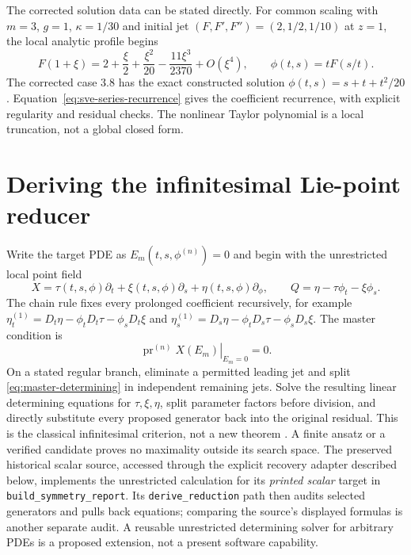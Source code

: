 \documentclass[11pt]{article}
\theoremstyle{definition}
\newcommand{\pr}{\operatorname{pr}}
\begin{document}
The corrected solution data can be stated directly. For common scaling with
$m=3$, $g=1$, $\kappa=1/30$ and initial jet $(F,F',F'')=(2,1/2,1/10)$
at $z=1$, the local analytic profile begins
\[
 F(1+\xi)=2+\frac{\xi}{2}+\frac{\xi^2}{20}
                -\frac{11\xi^3}{2370}+O(\xi^4),\qquad
 \phi(t,s)=tF(s/t).
\]
The corrected case 3.8 has the exact constructed solution
$\phi(t,s)=s+t+t^2/20$. Equation~\eqref{eq:sve-series-recurrence} gives the
coefficient recurrence, with explicit regularity and residual checks. The
nonlinear Taylor polynomial is a local truncation, not a global closed form.

\section{Deriving the infinitesimal Lie-point reducer}
\label{sec:infinitesimal-reducer}
Write the target PDE as $E_m(t,s,\phi^{(n)})=0$ and begin with the unrestricted
local point field
\begin{equation}\label{eq:master-generator}
 X=\tau(t,s,\phi)\partial_t+\xi(t,s,\phi)\partial_s
   +\eta(t,s,\phi)\partial_\phi,
 \qquad Q=\eta-\tau\phi_t-\xi\phi_s.
\end{equation}
The chain rule fixes every prolonged coefficient recursively, for example
$\eta_t^{(1)}=D_t\eta-\phi_tD_t\tau-\phi_sD_t\xi$ and
$\eta_s^{(1)}=D_s\eta-\phi_tD_s\tau-\phi_sD_s\xi$.
The master condition is
\begin{equation}\label{eq:master-determining}
 \left.\pr^{(n)}X(E_m)\right|_{E_m=0}=0.
\end{equation}
On a stated regular branch, eliminate a permitted leading jet and split
\eqref{eq:master-determining} in independent remaining jets. Solve the
resulting linear determining equations for $\tau,\xi,\eta$, split parameter
factors before division, and directly substitute every proposed generator
back into the original residual. This is the classical infinitesimal
criterion, not a new theorem \cite{olver,oliveri2026}. A finite ansatz or a
verified candidate proves no maximality outside its search space.
The preserved historical scalar source, accessed through the explicit
recovery adapter described below, implements the unrestricted calculation
for its \emph{printed scalar} target in \texttt{build\_symmetry\_report}.
Its \texttt{derive\_reduction} path then audits selected generators and
pulls back equations; comparing the source's displayed formulas is another
separate audit. A reusable unrestricted determining solver for arbitrary
PDEs is a proposed extension, not a present software capability.
\end{document}
